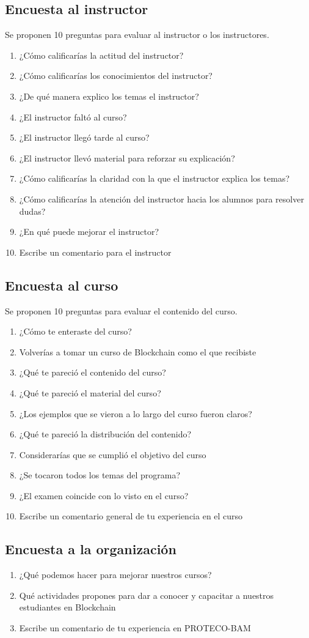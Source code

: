 \documentclass[a4paper,12pt]{lib/pub}
\begin{document}
\subsection{Encuesta al instructor}
Se proponen 10 preguntas para evaluar al instructor o los instructores.
\begin{enumerate}
	\item ¿Cómo calificarías la actitud del instructor?
	\item ¿Cómo calificarías los conocimientos del instructor?
	\item ¿De qué manera explico los temas el instructor?
	\item ¿El instructor faltó al curso?
	\item ¿El instructor llegó tarde al curso?
	\item ¿El instructor llevó material  para reforzar su explicación?
	\item ¿Cómo calificarías la claridad con la que el instructor explica los temas?
	\item ¿Cómo calificarías la atención del instructor hacia los alumnos para resolver dudas?
	\item ¿En qué puede mejorar el instructor?
	\item Escribe un comentario para el instructor
\end{enumerate}

\subsection{Encuesta al curso}
Se proponen 10 preguntas para evaluar el contenido del curso.
\begin{enumerate}
	\item ¿Cómo te enteraste del curso?
	\item Volverías a tomar un curso de Blockchain como el que recibiste
	\item ¿Qué te pareció el contenido del curso?
	\item ¿Qué te pareció el material del curso?
	\item ¿Los ejemplos que se vieron a lo largo del curso fueron claros?
	\item ¿Qué te pareció la distribución del contenido?
	\item Considerarías que se cumplió el objetivo del curso
	\item ¿Se tocaron todos los temas del programa?
	\item ¿El examen coincide con lo visto en el curso?
	\item Escribe un comentario general de tu experiencia en el curso
\end{enumerate}

\subsection{Encuesta a la organización}
\begin{enumerate}
	\item ¿Qué podemos hacer para mejorar nuestros cursos?
	\item Qué actividades propones para dar a conocer y capacitar a nuestros estudiantes en Blockchain
	\item Escribe un comentario de tu experiencia en PROTECO-BAM
\end{enumerate}
\end{document}
